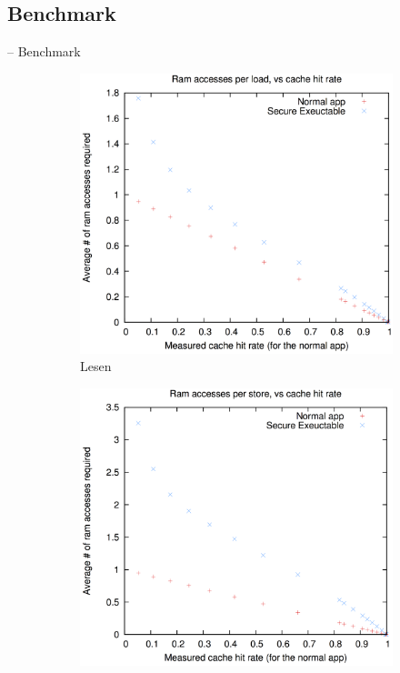 \documentclass[fleqn,11pt,aspectratio=43,table]{beamer}
\newlength\foo
\begin{document}
\subsection{Benchmark}
\begin{frame}{\insertsectionhead -- Benchmark}
	\vspace*{-.7em}
	\begin{figure} %
		\centering
		\begin{subfigure}[b]{0.48\columnwidth}
			\includegraphics[width=\columnwidth]{bench_per_load2}
			\caption*{\footnotesize Lesen \cite{boivie2013secureblue++:big}}
			\label{fig:bench_load}
		\end{subfigure}
		\hfill
		\begin{subfigure}[b]{0.48\columnwidth}
			\includegraphics[width=\columnwidth]{bench_per_store2}

\end{subfigure}
\end{figure}
\end{frame}
\end{document}

